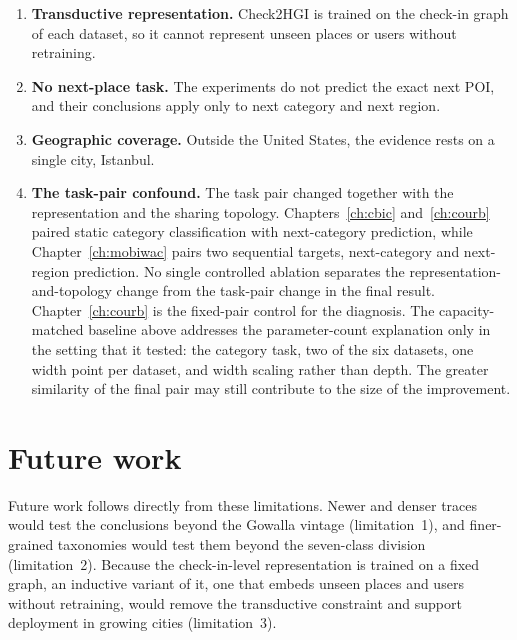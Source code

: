 \begin{enumerate}
    \item \textbf{Transductive representation.} Check2HGI is trained on the check-in
    graph of each dataset, so it cannot represent unseen places or users without
    retraining.
    \item \textbf{No next-place task.} The experiments do not predict the exact next
    POI, and their conclusions apply only to next category and next region.
    \item \textbf{Geographic coverage.} Outside the United States, the evidence rests on
    a single city, Istanbul.
    \item \textbf{The task-pair confound.} The task pair changed together with the
    representation and the sharing topology. Chapters~\ref{ch:cbic}
    and~\ref{ch:courb} paired static category classification with next-category
    prediction, while Chapter~\ref{ch:mobiwac} pairs two sequential targets,
    next-category and next-region prediction. No single controlled ablation
    separates the representation-and-topology change from the task-pair change in
    the final result. Chapter~\ref{ch:courb} is the fixed-pair control for the
    diagnosis. The capacity-matched baseline above addresses the parameter-count
    explanation only in the setting that it tested: the category task, two of the
    six datasets, one width point per dataset, and width scaling rather than
    depth. The greater similarity of the final pair may still contribute to the
    size of the improvement.
\end{enumerate}


\section{Future work}
\label{sec:conc:future}

Future work follows directly from these limitations. Newer and denser traces would
test the conclusions beyond the Gowalla vintage (limitation~1), and finer-grained
taxonomies would test them beyond the seven-class division (limitation~2). Because the
check-in-level representation is trained on a fixed graph, an inductive variant of it,
one that embeds unseen places and users without retraining, would remove the
transductive constraint and support deployment in growing cities (limitation~3).

